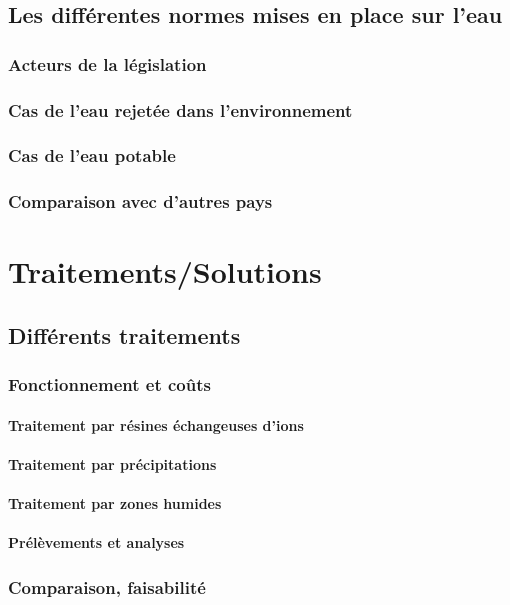 \documentclass{article}
\begin{document}
\subsection{Les différentes normes mises en place sur l’eau}
\subsubsection{Acteurs de la législation} 
\subsubsection{Cas de l’eau rejetée dans l’environnement }
\subsubsection{Cas de l’eau potable} 
\subsubsection{Comparaison avec d’autres pays }

\newpage
\section{Traitements/Solutions}
\subsection{Différents traitements}
\subsubsection{Fonctionnement et coûts}
\paragraph{Traitement par résines échangeuses d’ions} 
\paragraph{Traitement par précipitations}
\paragraph{Traitement par zones humides}
\paragraph{Prélèvements et analyses}
\subsubsection{Comparaison, faisabilité}
\end{document}
